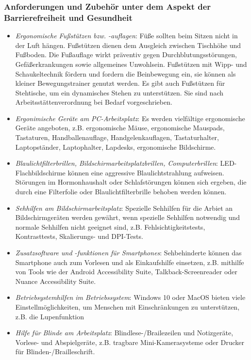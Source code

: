 \documentclass[a4paper, 12pt]{report}
\begin{document}
\subsubsection{Anforderungen und Zubehör unter dem Aspekt der Barrierefreiheit 
und Gesundheit}

\begin{itemize}
    \item \emph{Ergonomische Fußstützen bzw. -auflagen}: Füße sollten beim 
    Sitzen nicht in der Luft hängen. Fußstützen dienen dem Ausgleich zwischen 
    Tischhöhe und Fußboden. Die Fußauflage wirkt präventiv gegen 
    Durchblutungsstörungen, Gefäßerkrankungen sowie allgemeines Unwohlsein. 
    Fußstützen mit Wipp- und Schaukeltechnik fördern und fordern die 
    Beinbewegung ein, sie können als kleiner Bewegungstrainer genutzt werden. 
    Es gibt auch Fußstützen für Stehtische, um ein dynamisches Stehen zu 
    unterstützen. Sie sind nach Arbeitsstättenverordnung bei Bedarf 
    vorgeschrieben. 
    \item \emph{Ergonimische Geräte am PC-Arbeitsplatz}: Es werden vielfältige 
    ergonomische Geräte angeboten, z.B. ergonomische Mäuse, ergonomische 
    Mauspads, Tastaturen, Handballenauflage, Handgelenkauflagen, Tastaturhalter, 
    Laptopständer, Laptophalter, Lapdesks, ergonomische Bildschirme. 
    
    \item \emph{Blaulichtfilterbrillen, Bildschirmarbeitsplatzbrillen, 
    Computerbrillen}: LED-Flachbildschirme können eine aggressive 
    Blaulichtstrahlung aufweisen. Störungen im Hormonhaushalt oder 
    Schlafstörungen können sich ergeben, die durch eine Filterfolie oder 
    Blaulichtfilterbrille behoben werden können. 
    \item \emph{Sehhilfen am Bildschirmarbeitsplatz}: Spezielle Sehhilfen für 
    die Arbiet an Bildschirmgeräten werden gewährt, wenn spezielle Sehhilfen 
    notwendig und normale Sehhilfen nicht geeignet sind, z.B. 
    Fehlsichtigkeitstests, Kontrasttests, Skalierungs- und DPI-Tests. 
    \item \emph{Zusatzsoftware und -funktionen für Smartphones}: Sehbehinderte 
    können das Smartphone auch zum Vorlesen und als Einkaufshilfe einsetzen, 
    z.B. mithilfe von Tools wie der Android Accessibility Suite, 
    Talkback-Screenreader oder Nuance Accessibility Suite. 
    \item \emph{Betriebsystemhilfen im Betriebssystem}: Windows 10 oder MacOS 
    bieten viele Einstellmöglichkeiten, um Menschen mit Einschränkungen zu 
    unterstützen, z.B. die Lupenfunktion
    \item \emph{Hilfe für Blinde am Arbeitsplatz}: Blindlese-/Brailezeilen und
    Notizgeräte, Vorlese- und Abspielgeräte, z.B. tragbare Mini-Kamerasysteme 
    oder Drucker für Blinden-/Brailleschrift.
\end{itemize}
\end{document}
